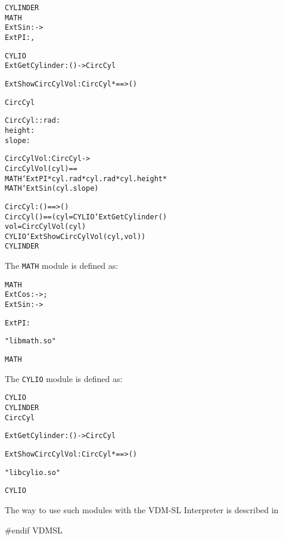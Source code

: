 \documentclass[\pformat,12pt]{article}
\begin{document}
\begin{description}
\begin{alltt}
 CYLINDER
     MATH
          ExtSin :  -> 
          ExtPI : ,

     CYLIO
          ExtGetCylinder : () -> CircCyl
   
          ExtShowCircCylVol : CircCyl *  ==> ()

         CircCyl  

        CircCyl :: rad    : 
                   height : 
                   slope  : 

        CircCylVol : CircCyl -> 
        CircCylVol(cyl) ==
          MATH`ExtPI * cyl.rad * cyl.rad * cyl.height * 
          MATH`ExtSin(cyl.slope)

        CircCyl : () ==> ()
        CircCyl() == (  cyl = CYLIO`ExtGetCylinder()  
                          vol = CircCylVol(cyl) 
                            CYLIO`ExtShowCircCylVol(cyl, vol))
 CYLINDER
\end{alltt}

The {\tt MATH} module is defined as:

\begin{alltt}
 MATH
      ExtCos :  -> ;
      ExtSin :  ->   
      
      ExtPI : 
  
      "libmath.so" 

 MATH
\end{alltt}

The {\tt CYLIO} module is defined as:

\begin{alltt}
 CYLIO
     CYLINDER
        CircCyl

       ExtGetCylinder : () -> CircCyl
   
       ExtShowCircCylVol : CircCyl *  ==> ()

      "libcylio.so"

 CYLIO
\end{alltt}

The way to use such modules with the VDM-SL Interpreter is described
in \cite{DLMan-SCSK}
\end{description}
#endif VDMSL
\end{document}
